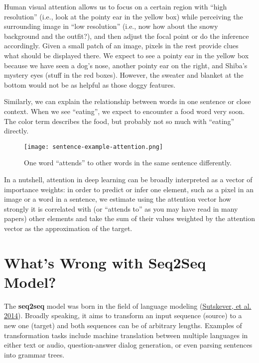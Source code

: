 \documentclass[12pt]{article}
\begin{document}
Human visual attention allows us to focus on a certain region with ``high resolution'' (i.e., look at the pointy ear in the yellow box) while perceiving the surrounding image in ``low resolution'' (i.e., now how about the snowy background and the outfit?), and then adjust the focal point or do the inference accordingly. Given a small patch of an image, pixels in the rest provide clues what should be displayed there. We expect to see a pointy ear in the yellow box because we have seen a dog’s nose, another pointy ear on the right, and Shiba’s mystery eyes (stuff in the red boxes). However, the sweater and blanket at the bottom would not be as helpful as those doggy features.

Similarly, we can explain the relationship between words in one sentence or close context. When we see ``eating'', we expect to encounter a food word very soon. The color term describes the food, but probably not so much with ``eating'' directly.

\begin{figure}[H]
    \centering
    \texttt{[image: sentence-example-attention.png]}
    \caption{One word ``attends'' to other words in the same sentence differently.}
\end{figure}

In a nutshell, attention in deep learning can be broadly interpreted as a vector of importance weights: in order to predict or infer one element, such as a pixel in an image or a word in a sentence, we estimate using the attention vector how strongly it is correlated with (or ``attends to'' as you may have read in many papers) other elements and take the sum of their values weighted by the attention vector as the approximation of the target.

\section{What’s Wrong with Seq2Seq Model?}
The \textbf{seq2seq} model was born in the field of language modeling (\href{https://arxiv.org/abs/1409.3215}{Sutskever, et al. 2014}). Broadly speaking, it aims to transform an input sequence (source) to a new one (target) and both sequences can be of arbitrary lengths. Examples of transformation tasks include machine translation between multiple languages in either text or audio, question-answer dialog generation, or even parsing sentences into grammar trees.
\end{document}
